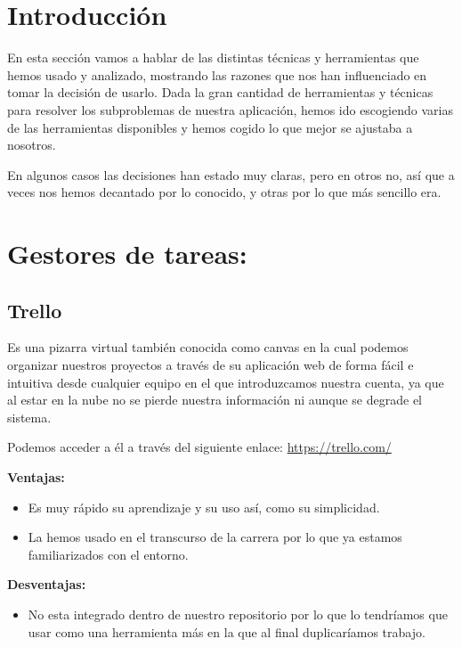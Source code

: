 
\section{Introducción}
En esta sección vamos a hablar de las distintas técnicas y herramientas que hemos usado y analizado, mostrando las razones que nos han influenciado en tomar la decisión de usarlo.
Dada la gran cantidad de herramientas y técnicas para resolver los subproblemas de nuestra aplicación, hemos ido escogiendo varias de las herramientas disponibles y hemos cogido lo que mejor se ajustaba a nosotros.

En algunos casos las decisiones han estado muy claras, pero en otros no, así que a veces nos hemos decantado por lo conocido, y otras por lo que más sencillo era.

\section{Gestores de tareas:}
\subsection{Trello}
Es una pizarra virtual también conocida como canvas en la cual podemos organizar nuestros proyectos a través de su aplicación web de forma fácil e intuitiva desde cualquier equipo en el que introduzcamos nuestra cuenta, ya que al estar en la nube no se pierde nuestra información ni aunque se degrade el sistema.

Podemos acceder a él a través del siguiente enlace: 
\url{https://trello.com/}



\textbf{Ventajas:}

\begin{itemize}
\item Es muy rápido su aprendizaje y su uso así, como su simplicidad.

\item La hemos usado en el transcurso de la carrera por lo que ya estamos familiarizados con el entorno.
\end{itemize}

\textbf{Desventajas:}

\begin{itemize}
\item No esta integrado dentro de nuestro repositorio por lo que lo tendríamos que usar como una herramienta más en la que al final duplicaríamos trabajo.
\end{itemize}


